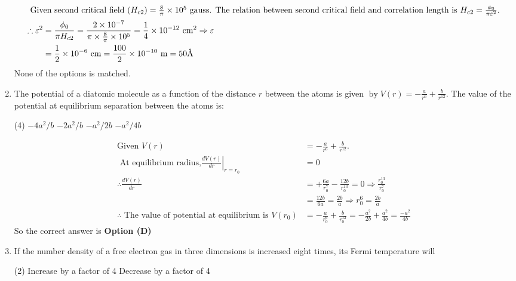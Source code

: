 \begin{enumerate}
\begin{answer}
		\begin{align*}
		\intertext{ Given second critical field $\left(H_{c 2}\right)=\frac{8}{\pi} \times 10^{5}$ gauss. The relation between second critical field and correlation length is $H_{c 2}=\frac{\phi_{0}}{\pi \varepsilon^{2}}$.}
		\therefore \varepsilon^{2}&=\frac{\phi_{0}}{\pi H_{c 2}}=\frac{2 \times 10^{-7}}{\pi \times \frac{8}{\pi} \times 10^{5}}=\frac{1}{4} \times 10^{-12} \mathrm{~cm}^{2} \Rightarrow \varepsilon\\&=\frac{1}{2} \times 10^{-6} \mathrm{~cm}=\frac{100}{2} \times 10^{-10} \mathrm{~m}=50 \text{\AA}
		\end{align*}
		None of the options is matched.
	\end{answer}
	\item The potential of a diatomic molecule as a function of the distance $r$ between the atoms is given $\operatorname{by} V(r)=-\frac{a}{r^{6}}+\frac{b}{r^{12}} .$ The value of the potential at equilibrium separation between the atoms is:
	{}
	\begin{tasks}(4)
		\task[\textbf{A.}] $-4 a^{2} / b$
		\task[\textbf{B.}] $-2 a^{2} / b$
		\task[\textbf{C.}] $-a^{2} / 2 b$
		\task[\textbf{D.}] $-a^{2} / 4 b$
	\end{tasks}
	\begin{answer}
		\begin{align*}
		\text{Given }V(r)&=-\frac{a}{r^{6}}+\frac{b}{r^{12}} .\\\text{ At equilibrium radius,} \left.\frac{d V(r)}{d r}\right|_{r=r_{0}}&=0\\
		\therefore \frac{d V(r)}{d r}&=+\frac{6 a}{r_{0}^{7}}-\frac{12 b}{r_{0}^{13}}=0 \Rightarrow \frac{r_{0}^{13}}{r_{0}^{7}}\\&=\frac{12 b}{6 a}=\frac{2 b}{a} \Rightarrow r_{0}^{6}=\frac{2 b}{a}\\
		\therefore\text{ The value of potential at equilibrium is } V\left(r_{0}\right)&=-\frac{a}{r_{0}^{6}}+\frac{b}{r_{0}^{12}}=-\frac{a^{2}}{2 b}+\frac{a^{2}}{4 b}=\frac{-a^{2}}{4 b}
		\end{align*}
		So the correct answer is \textbf{Option (D)}
	\end{answer}
	\item If the number density of a free electron gas in three dimensions is increased eight times, its Fermi temperature will
	{}
	\begin{tasks}(2)
		\task[\textbf{A.}] Increase by a factor of 4
		\task[\textbf{B.}]  Decrease by a factor of 4

\end{tasks}
\end{enumerate}

